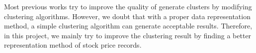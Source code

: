 Most previous works try to improve the quality of generate clusters by modifying clustering algorithms. However, we doubt that with a proper data representation method, a simple clustering algorithm can generate acceptable results. Therefore, in this project, we mainly try to improve the clustering result by finding a better representation method of stock price records.